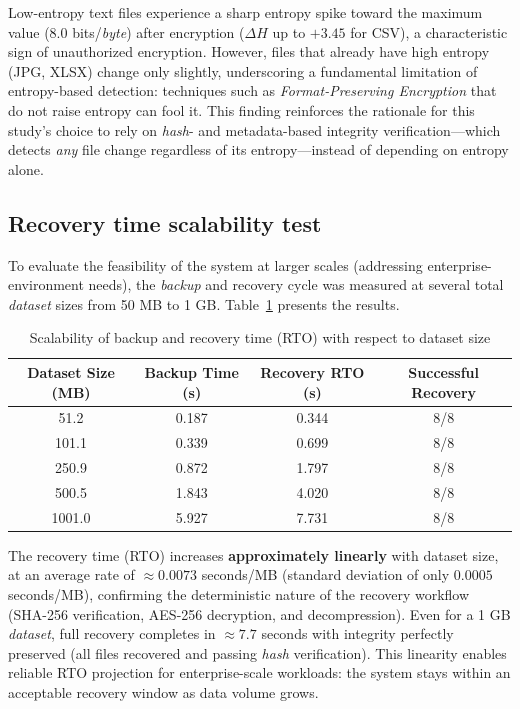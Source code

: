 \documentclass{iaesarticle}
\begin{document}
Low-entropy text files experience a sharp entropy spike toward the maximum value ($8.0$ bits/\textit{byte}) after encryption ($\Delta H$ up to $+3.45$ for CSV), a characteristic sign of unauthorized encryption. However, files that already have high entropy (JPG, XLSX) change only slightly, underscoring a fundamental limitation of entropy-based detection: techniques such as \textit{Format-Preserving Encryption} that do not raise entropy can fool it. This finding reinforces the rationale for this study's choice to rely on \textit{hash}- and metadata-based integrity verification---which detects \textit{any} file change regardless of its entropy---instead of depending on entropy alone.

\subsection{Recovery time scalability test}
To evaluate the feasibility of the system at larger scales (addressing enterprise-environment needs), the \textit{backup} and recovery cycle was measured at several total \textit{dataset} sizes from 50 MB to 1 GB. Table~\ref{tab:scalability} presents the results.

\begin{table}[H]
\centering
\fontsize{8pt}{10pt}\selectfont
\caption{Scalability of backup and recovery time (RTO) with respect to dataset size}
\label{tab:scalability}
\begin{tabular}{c c c c}
\hline
\textbf{Dataset Size (MB)} & \textbf{Backup Time (s)} & \textbf{Recovery RTO (s)} & \textbf{Successful Recovery} \\
\hline
51.2   & 0.187 & 0.344 & 8/8 \\
101.1  & 0.339 & 0.699 & 8/8 \\
250.9  & 0.872 & 1.797 & 8/8 \\
500.5  & 1.843 & 4.020 & 8/8 \\
1001.0 & 5.927 & 7.731 & 8/8 \\
\hline
\end{tabular}
\end{table}

The recovery time (RTO) increases \textbf{approximately linearly} with dataset size, at an average rate of $\approx 0.0073$ seconds/MB (standard deviation of only $0.0005$ seconds/MB), confirming the deterministic nature of the recovery workflow (SHA-256 verification, AES-256 decryption, and decompression). Even for a 1 GB \textit{dataset}, full recovery completes in $\approx 7.7$ seconds with integrity perfectly preserved (all files recovered and passing \textit{hash} verification). This linearity enables reliable RTO projection for enterprise-scale workloads: the system stays within an acceptable recovery window as data volume grows.
\end{document}
